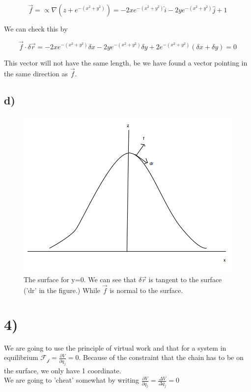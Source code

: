 \documentclass[a4paper,norsk, 10pt]{article}
\begin{document}
$$
\vec{f} = \varpropto \nabla (z+e^{-(x^2 + y^2)}) = -2x e^{-(x^2 + y^2)} \hat{i} - 2y e^{-(x^2 + y^2)} \hat{j} + 1
$$

We can check this by

$$
\vec{f} \cdot \delta \vec{r} = -2x e^{-(x^2 + y^2)} \delta x - 2y e^{-(x^2 + y^2)} \delta y + 2e^{-(x^2 + y^2)}(\delta x + \delta y) = 0
$$

This vector will not have the same length, be we have found a vector pointing in the same direction as $\vec{f}$.

\subsection*{d)}
\begin{figure}[H]
\centering
\includegraphics[scale=.4]{4d.png}
\caption{The surface for y=0. We can see that $\delta \vec{r}$ is tangent to the surface ('dr' in the figure.) While $\vec{f}$ is normal to the surface.}
\end{figure}

\section*{4)}
We are going to use the principle of virtual work and that for a system in equilibrium $\mathcal{F_j} = \frac{\partial V}{\partial q_j} = 0$. Because of the constraint that the chain has to be on the surface, we only have 1 coordinate.\\

We are going to 'cheat' somewhat by writing $\frac{\partial V}{\partial q_j} = \frac{\Delta V}{\Delta q_j} = 0$
\end{document}
